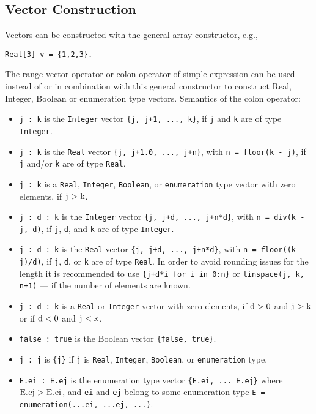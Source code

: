 \subsection{Vector Construction}

Vectors can be constructed with the general array constructor, e.g.,
\begin{lstlisting}[language=modelica]
  Real[3] v = {1,2,3}.
\end{lstlisting}
The range vector operator or colon operator of simple-expression can be
used instead of or in combination with this general constructor to
construct Real, Integer, Boolean or enumeration type vectors. Semantics
of the colon operator:
\begin{itemize}
\item
  \lstinline!j : k! is the \lstinline!Integer! vector \lstinline!{j, j+1, ..., k}!, if \lstinline!j! and \lstinline!k! are of type
  \lstinline!Integer!.
\item
  \lstinline!j : k! is the \lstinline!Real! vector \lstinline!{j, j+1.0, ..., j+n}!, with \lstinline!n = floor(k - j)!, if
  \lstinline!j! and/or \lstinline!k! are of type \lstinline!Real!.
\item
  \lstinline!j : k! is a \lstinline!Real!, \lstinline!Integer!, \lstinline!Boolean!, or \lstinline!enumeration! type vector with
  zero elements, if $\text{\lstinline!j!} > \text{\lstinline!k!}$.
\item
  \lstinline!j : d : k! is the \lstinline!Integer! vector \lstinline!{j, j+d, ..., j+n*d}!, with \lstinline!n = div(k - j, d)!, if \lstinline!j!, \lstinline!d!, and \lstinline!k! are of type \lstinline!Integer!.
\item
  \lstinline!j : d : k! is the \lstinline!Real! vector \lstinline!{j, j+d, ..., j+n*d}!, with \lstinline!n = floor((k-j)/d)!, if \lstinline!j!, \lstinline!d!, or \lstinline!k! are of type \lstinline!Real!. In order to avoid rounding issues for the length it is recommended to use \lstinline!{j+d*i for i in 0:n}! or \lstinline!linspace(j, k, n+1)! --- if the number of elements are
  known.
\item
  \lstinline!j : d : k! is a \lstinline!Real! or \lstinline!Integer! vector with zero elements, if $\text{\lstinline!d!}
  > 0$ and $\text{\lstinline!j!} > \text{\lstinline!k!}$ or if $\text{\lstinline!d!} < 0$ and $\text{\lstinline!j!}
  < \text{\lstinline!k!}$.
\item
  \lstinline!false : true! is the Boolean vector \lstinline!{false, true}!.
\item
  \lstinline!j : j! is \lstinline!{j}! if \lstinline!j! is \lstinline!Real!, \lstinline!Integer!, \lstinline!Boolean!, or \lstinline!enumeration! type.
\item
  \lstinline!E.ei : E.ej! is the enumeration type vector \lstinline!{E.ei, ... E.ej}! where
  $\text{\lstinline!E.ej!} > \text{\lstinline!E.ei!}$, and \lstinline!ei! and \lstinline!ej! belong to some enumeration type
  \lstinline!E = enumeration(...ei, ...ej, ...)!.
\end{itemize}

